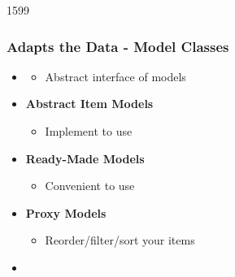 \begin{slide}{1599}\frametitle{Adapts the Data - Model Classes}
  \begin{itemize}
  \item \textbf{}
    \begin{itemize}
    \item Abstract interface of models
   \end{itemize}
  \item \textbf{Abstract Item Models}
    \begin{itemize}
    \item Implement to use
 \end{itemize}
  \item \textbf{Ready-Made Models}
    \begin{itemize}
    \item Convenient to use
  \end{itemize}
 \item \textbf{Proxy Models}
   \begin{itemize}
   \item Reorder/filter/sort your items
  \end{itemize}
   \item[] 
 \end{itemize}
\end{slide}

